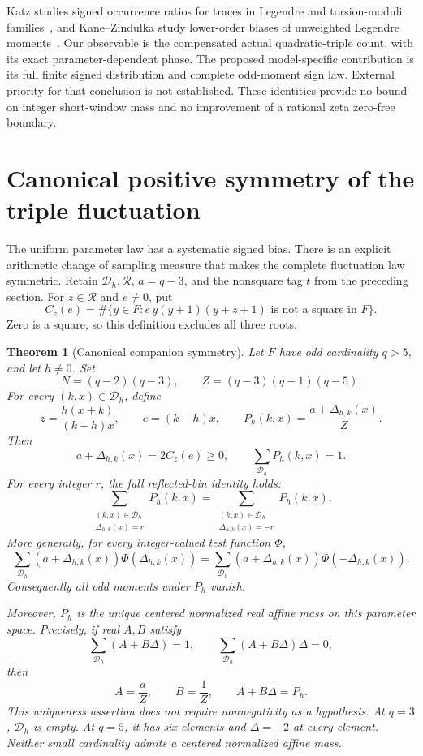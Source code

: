 \documentclass[11pt]{article}
\newtheorem{theorem}{Theorem}[section]
\begin{document}
Katz studies signed occurrence ratios for traces in Legendre and
torsion-moduli families~\cite{KatzTraceRatios}, and
Kane--Zindulka study lower-order biases of unweighted Legendre
moments~\cite{KaneZindulka}. Our observable is the compensated actual
quadratic-triple count, with its exact parameter-dependent phase.
The proposed model-specific contribution is its full finite signed
distribution and complete odd-moment sign law. External priority
for that conclusion is not established.
These identities provide no bound on integer short-window mass and
no improvement of a rational zeta zero-free boundary.

\section{Canonical positive symmetry of the triple fluctuation}

The uniform parameter law has a systematic signed bias. There is an
explicit arithmetic change of sampling measure that makes the complete
fluctuation law symmetric. Retain \(\mathcal D_h,\mathcal R\),
\(a=q-3\), and the nonsquare tag \(t\) from the preceding section.
For \(z\in\mathcal R\) and \(e\ne0\), put
\[
 C_z(e)=\#\{y\in F:e\,y(y+1)(y+z+1)\text{ is not a square in }F\}.
\]
Zero is a square, so this definition excludes all three roots.

\begin{theorem}[Canonical companion symmetry]\label{thm:tripleCompanionSymmetry}
Let \(F\) have odd cardinality \(q>5\), and let \(h\ne0\). Set
\[
 N=(q-2)(q-3),\qquad Z=(q-3)(q-1)(q-5).
\]
For every \((k,x)\in\mathcal D_h\), define
\[
 z=\frac{h(x+k)}{(k-h)x},\qquad e=(k-h)x,\qquad
 P_h(k,x)=\frac{a+\Delta_{h,k}(x)}{Z}.
\]
Then
\[
 a+\Delta_{h,k}(x)=2C_z(e)\ge0,\qquad
 \sum_{\mathcal D_h}P_h(k,x)=1.
 \tag{CS1}
\]
For every integer \(r\), the full reflected-bin identity holds:
\[
 \sum_{\substack{(k,x)\in\mathcal D_h\\\Delta_{h,k}(x)=r}}P_h(k,x)
 =
 \sum_{\substack{(k,x)\in\mathcal D_h\\\Delta_{h,k}(x)=-r}}P_h(k,x).
 \tag{CS2}
\]
More generally, for every integer-valued test function \(\Phi\),
\[
 \sum_{\mathcal D_h}(a+\Delta_{h,k}(x))\Phi(\Delta_{h,k}(x))
 =
 \sum_{\mathcal D_h}(a+\Delta_{h,k}(x))\Phi(-\Delta_{h,k}(x)).
 \tag{CS3}
\]
Consequently all odd moments under \(P_h\) vanish.

Moreover, \(P_h\) is the unique centered normalized real affine mass
on this parameter space. Precisely, if real \(A,B\) satisfy
\[
 \sum_{\mathcal D_h}(A+B\Delta)=1,\qquad
 \sum_{\mathcal D_h}(A+B\Delta)\Delta=0,
\]
then
\[
 A=\frac{a}{Z},\qquad B=\frac1Z,\qquad A+B\Delta=P_h.
 \tag{CS4}
\]
This uniqueness assertion does not require nonnegativity as a hypothesis.
At \(q=3\), \(\mathcal D_h\) is empty. At \(q=5\), it has six
elements and \(\Delta=-2\) at every element. Neither small cardinality
admits a centered normalized affine mass.
\end{theorem}
\end{document}

